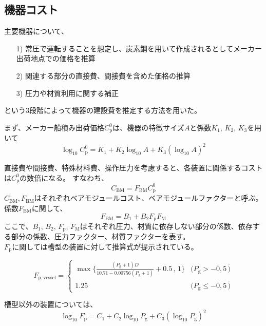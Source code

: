 \documentclass[a4j]{jsreport}
\begin{document}
\subsection{機器コスト}
主要機器について、
\begin{itemize}
    \item[1)]常圧で運転することを想定し、炭素鋼を用いて作成されるとしてメーカー出荷地点での価格を推算
    \item[2)]関連する部分の直接費、間接費を含めた価格の推算
    \item[3)]圧力や材質利用に関する補正  
\end{itemize}
という3段階によって機器の建設費を推定する方法を用いた。
\par
まず、メーカー船積み出荷価格$C_\mathrm{p}^0$は、機器の特徴サイズ$A$と係数$K_1,\,K_2,\,K_3$を用いて
\begin{equation}
    \log_{10}C_\mathrm{p}^0 = K_1 + K_2\log_{10} A + K_3(\log_{10} A)^2
\end{equation}
\par
直接費や間接費、特殊材料費、操作圧力を考慮すると、各装置に関係するコストは$C_\mathrm{p}^0$の数倍になる。
すなわち、
\begin{equation}
    C_\mathrm{BM} = F_\mathrm{BM} C_\mathrm{p}^0
\end{equation}
$C_\mathrm{BM}$,\,$ F_\mathrm{BM}$はそれぞれベアモジュールコスト、ベアモジュールファクターと呼ぶ。
係数$F_\mathrm{BM}$に関して、
\begin{equation}
    F_\mathrm{BM} = B_1 + B_2 F_\mathrm{p} F_\mathrm{M}
\end{equation}
ここで、$B_1,\, B_2 ,\,F_\mathrm{p},\, F_\mathrm{M}$はそれぞれ圧力、材質に依存しない部分の係数、依存する部分の係数、圧力ファクター、材質ファクターを表す。\\
$F_\mathrm{p}$に関しては槽型の装置に対して推算式が提示されている。\\
\begin{center}
\begin{equation}
    F_\mathrm{p,vessel} = 
        \begin{cases}
            \max\{\frac{(P_\mathrm{g}+1)D}{10.71-0.00756(P_\mathrm{g}+1)}+0.5 \,,\, 1\} & (P_\mathrm{g} > -0,5\, \bar) \\
            1.25 & (P_\mathrm{g} \leq -0,5\, \bar)
        \end{cases}
\end{equation}
\end{center}
槽型以外の装置については、
\begin{equation}
    \log_{10}F_\mathrm{p} = C_1 + C_2\log_{10} P_\mathrm{g} + C_3(\log_{10} P_\mathrm{g})^2
\end{equation}
\end{document}
